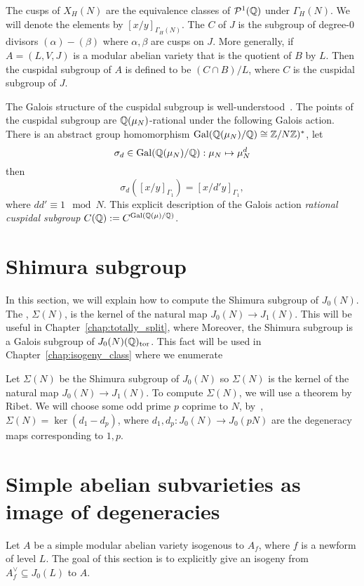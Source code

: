 The cusps of $X_H(N)$ are the equivalence classes of $\mathcal{P}^1(\mathbb{Q})$ under
$\Gamma_H(N)$. We will denote the elements by $[x/y]_{\Gamma_H(N)}$. The
 $C$ of $J$ is the subgroup of degree-0 divisors
$(\alpha)-(\beta)$ where $\alpha, \beta$ are cusps on $J$. More generally, if
$A=(L, V, J)$ is a modular abelian variety that is the quotient of $B$ by $L$.
Then the cuspidal subgroup of $A$ is defined to be $(C\cap B)/L$, where $C$ is
the cuspidal subgroup of $J$.

The Galois structure of the cuspidal subgroup is well-understood~\cite[\S
1.3]{stevens:thesis}. The points of the cuspidal subgroup are
$\mathbb{Q}(\mu_N)$-rational under the following Galois action. There is an abstract
group homomorphism $\operatorname{Gal}(\mathbb{Q}(\mu_N)/\mathbb{Q})\cong \mathbb{Z}/N\mathbb{Z})^*$, let
\[
    \sigma_d\in \operatorname{Gal}(\mathbb{Q}(\mu_N)/\mathbb{Q}):\mu_N\mapsto \mu_N ^d
\]
then
\[
    \sigma_d([x/y]_{\Gamma_1})=[x/d'y]_{\Gamma_1},
\]
where $dd'\equiv 1 \mod{N}$. This explicit description of the Galois action
\emph{rational cuspidal subgroup} $C(\mathbb{Q}):=C^{\operatorname{Gal}(\mathbb{Q}(\mu)/\mathbb{Q})}$.

\section{Shimura subgroup}%
\label{sec:shimura_subgroup}

In this section, we will explain how to compute the Shimura subgroup of
$J_0(N)$. The , $\Sigma(N)$, is the kernel of the
natural map $J_0(N)\to J_1(N)$. This will be useful in
Chapter~\ref{chap:totally_split}, where 
Moreover, the Shimura subgroup is a Galois subgroup of $J_0(N)(\mathbb{Q})_{\mathrm{tor}}$. This
fact will be used in Chapter~\ref{chap:isogeny_class} where we enumerate

Let $\Sigma(N)$ be the Shimura subgroup of $J_0(N)$ so $\Sigma(N)$ is the
kernel of the natural map $J_0(N)\to J_1(N)$. To compute $\Sigma(N)$, we will
use a theorem by Ribet. We will choose some odd prime $p$ coprime to $N$,
by~\cite[Prop. 1]{ribet:raising}, $\Sigma(N)=\ker(d_1-d_p)$, where
$d_1,d_p:J_0(N)\to J_0(pN)$ are the degeneracy maps corresponding to $1,p$.

\section{Simple abelian subvarieties as image of degeneracies}

Let $A$ be a simple modular abelian variety isogenous to $A_f$, where $f$ is a
newform of level $L$. The goal of this section is to explicitly give an isogeny
from $A_f ^\vee\subseteq J_0(L)$ to $A$. 

